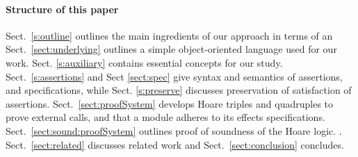  \paragraph{Structure of this paper}
Sect.\ \ref{s:outline}   outlines the main ingredients of our approach in terms of an 
Sect.\ \ref{sect:underlying} outlines a simple object-oriented language used for our work. 
 Sect. \ref{s:auxiliary}  {contains essential concepts for our study}.
Sect.\ \ref{s:assertions} and 
 Sect \ref{sect:spec}  give syntax and semantics of assertions, and  specifications,
{while Sect. \ref{s:preserve} discusses preservation of satisfaction of assertions.}
Sect.\ \ref{sect:proofSystem} develops Hoare triples and quadruples to prove external calls, and that a module adheres to its \tamed effects specifications.
Sect.\ \ref{sect:sound:proofSystem} outlines  proof of soundness of
the Hoare logic. 
. 
Sect.\ \ref{sect:related} discusses related
work and Sect.\ \ref{sect:conclusion} concludes. 
 
 


